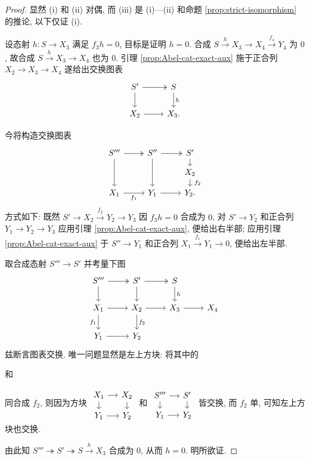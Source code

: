 \begin{proof}
	显然 (i) 和 (ii) 对偶, 而 (iii) 是 (i)---(ii) 和命题 \ref{prop:strict-isomorphism} 的推论, 以下仅证 (i).
	
	设态射 $h: S \to X_3$ 满足 $f_3 h = 0$, 目标是证明 $h = 0$. 合成 $S \xrightarrow{h} X_3 \to X_4 \xrightarrow{f_4} Y_4$ 为 $0$, 故合成 $S \xrightarrow{h} X_3 \to X_4$ 也为 $0$. 引理 \ref{prop:Abel-cat-exact-aux} 施于正合列 $X_2 \to X_3 \to X_4$ 遂给出交换图表
	\[\begin{tikzcd}
		S' \arrow[twoheadrightarrow, r] \arrow[d] & S \arrow[d, "h"] \\
		X_2 \arrow[r] & X_3 .
	\end{tikzcd}\]

	今将构造交换图表
	\[\begin{tikzcd}[row sep=small]
		S''' \arrow[twoheadrightarrow, r] \arrow[dd] & S'' \arrow[twoheadrightarrow, r] \arrow[dd] & S' \arrow[d] \\
		& & X_2 \arrow[d, "f_2" inner sep=0.5em] \\
		X_1 \arrow[r, "f_1"'] & Y_1 \arrow[r] & Y_2 . 
	\end{tikzcd}\]
	方式如下: 既然 $S' \to X_2 \xrightarrow{f_2} Y_2 \to Y_3$ 因 $f_3 h = 0$ 合成为 $0$, 对 $S' \to Y_2$ 和正合列 $Y_1 \to Y_2 \to Y_3$ 应用引理 \ref{prop:Abel-cat-exact-aux}, 便给出右半部; 应用引理 \ref{prop:Abel-cat-exact-aux} 于 $S'' \to Y_1$ 和正合列 $X_1 \xrightarrow{f_1} Y_1 \to 0$, 便给出左半部.
	
	取合成态射 $S''' \to S'$ 并考量下图
	\[\begin{tikzcd}
		S''' \arrow[twoheadrightarrow, r] \arrow[d] & S' \arrow[twoheadrightarrow, r] \arrow[d] & S \arrow[d, "h"] & \\
		X_1 \arrow[r] \arrow[d, "f_1"'] & X_2 \arrow[r] \arrow[d, "f_2"] & X_3 \arrow[r] & X_4 \\
		Y_1 \arrow[r] & Y_2 & &
	\end{tikzcd}\]
	兹断言图表交换. 唯一问题显然是左上方块: 将其中的
	和
	同合成 $f_2$, 则因为方块
	$\begin{tikzcd}[row sep=small, column sep=small]
		X_1 \arrow[r] \arrow[d] & X_2 \arrow[d] \\
		Y_1 \arrow[r] & Y_2
	\end{tikzcd}$ 和 $\begin{tikzcd}[row sep=small, column sep=small]
		S''' \arrow[r] \arrow[d] & S' \arrow[d] \\
		Y_1 \arrow[r] & Y_2
	\end{tikzcd}$
	皆交换, 而 $f_2$ 单, 可知左上方块也交换.
	
	由此知 $S''' \twoheadrightarrow S' \twoheadrightarrow S \xrightarrow{h} X_3$ 合成为 $0$, 从而 $h=0$. 明所欲证.
\end{proof}

